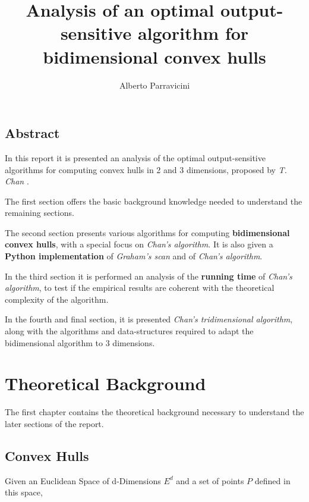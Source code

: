 \documentclass[
12pt,
a4paper,
oneside,
headinclude,
footinclude]{report}
\title{\textbf{Analysis of an optimal output-sensitive algorithm for bidimensional convex hulls}}
\author{{Alberto Parravicini}}
\date{}	%
\theoremstyle{definition} %
\begin{document}
\maketitle
{}
\setcounter{page}{1}

\section*{Abstract}
In this report it is presented an analysis of the optimal output-sensitive algorithms for computing convex hulls in 2 and 3 dimensions, proposed by \textit{T. Chan} \cite{Chan1996}. 

The first section offers the basic background knowledge needed to understand the remaining sections.

The second section presents various algorithms for computing \textbf{bidimensional convex hulls}, with a special focus on \textit{Chan's algorithm}.
It is also given a \textbf{Python implementation} of \textit{Graham's scan} and of \textit{Chan's algorithm}.

In the third section it is performed an analysis of the \textbf{running time} of \textit{Chan's algorithm}, to test if the empirical results are coherent with the theoretical complexity of the algorithm.

In the fourth and final section, it is presented \textit{Chan's tridimensional algorithm}, along with the algorithms and data-structures required to adapt the bidimensional algorithm to 3 dimensions.


\chapter{Theoretical Background}
The first chapter contains the theoretical background necessary to understand the later sections of the report.\\
\section{Convex Hulls}
Given an Euclidean Space of d-Dimensions $E^d$ and a set of points $P$ defined in this space, 
\end{document}
